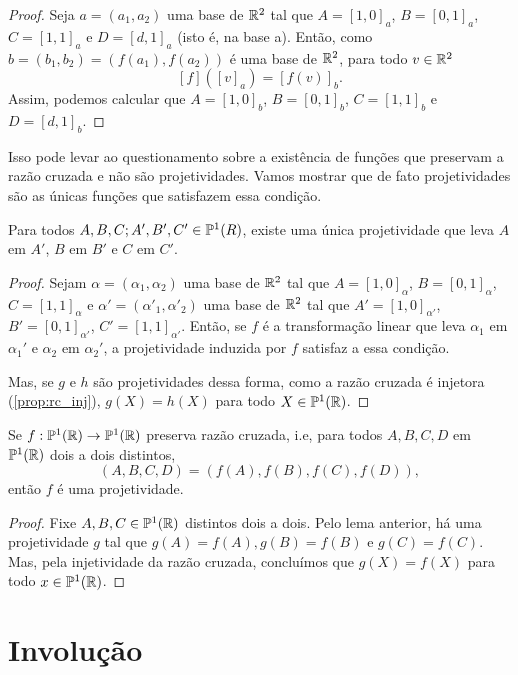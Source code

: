 \begin{proof}
Seja $a = (a_1,a_2)$ uma base de $\mathbb{R}^2$ tal que \(A = [1, 0]_a\), \(B = [0, 1]_a\), \(C = [1, 1]_a\) e \(D = [d, 1]_a\) (isto é, na base a). Então, como $ b = (b_1,b_2) = (f(a_1), f(a_2))$ é uma base de $\mathbb{R}^2$, para todo $v\in \mathbb{R}^2$ 
\[[f]([v]_a) = [f(v)]_b. \]
Assim, podemos calcular que 
\(A = [1, 0]_b\), \(B = [0, 1]_b\), \(C = [1, 1]_b\) e \(D = [d, 1]_b\).
\end{proof}

Isso pode levar ao questionamento sobre a existência de funções que preservam a razão cruzada e não são projetividades. Vamos mostrar que de fato projetividades são as únicas funções que satisfazem essa condição.

\begin{lem}
Para todos $A,B,C;A',B',C' \in \mathbb{P}^1(R)$, existe uma única projetividade que leva $A$ em $A'$, $B$ em $B'$ e $C$ em $C'$.
\end{lem}

\begin{proof}
Sejam $\alpha = (\alpha_1, \alpha_2)$ uma base de $\mathbb{R}^2$ tal que \(A = [1, 0]_\alpha\), \(B = [0, 1]_\alpha\), \(C = [1, 1]_\alpha\) e $\alpha' = (\alpha'_1, \alpha'_2)$ uma base de $\mathbb{R}^2$ tal que \(A' = [1, 0]_{\alpha'}\), \(B' = [0, 1]_{\alpha'}\), \(C' = [1, 1]_{\alpha'}\). Então, se $f$ é a transformação linear que leva $\alpha_1$ em $\alpha_1'$ e $\alpha_2$ em $\alpha_2'$, a projetividade induzida por $f$ satisfaz a essa condição.

Mas, se $g$ e $h$ são projetividades dessa forma, como a razão cruzada é injetora (\ref{prop:rc_inj}),
$g(X) = h(X)$ para todo \(X\in \mathbb{P}^1(\mathbb{R})\).
\end{proof}

\begin{thm}
Se $f:\mathbb{P}^1(\mathbb{R}) \to \mathbb{P}^1(\mathbb{R})$ preserva razão cruzada, i.e, para todos $A,B,C,D$ em $\mathbb{P}^1(\mathbb{R})$ dois a dois distintos, 
\[(A,B,C,D) = (f(A),f(B),f(C),f(D)),\]
então $f$ é uma projetividade.
\end{thm}

\begin{proof}
Fixe $A,B,C \in \mathbb{P}^1(\mathbb{R})$ distintos dois a dois.
Pelo lema anterior, há uma projetividade $g$ tal que $g(A) = f(A), g(B) = f(B)$ e $g(C) = f(C)$. Mas, pela injetividade da razão cruzada, concluímos que $g(X) = f(X)$ para todo $x\in \mathbb{P}^1(\mathbb{R})$.
\end{proof}

\section{Involução}

